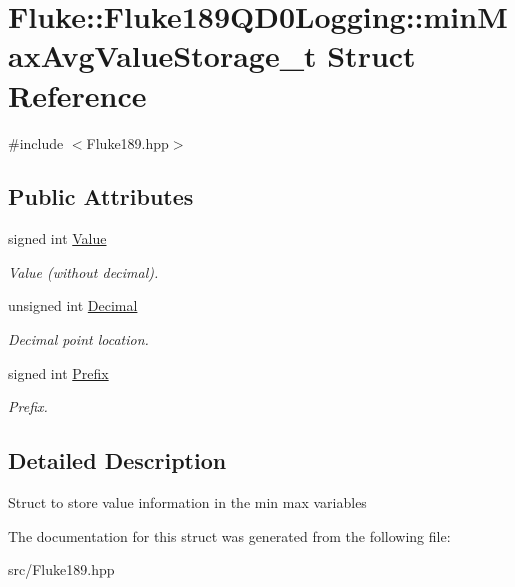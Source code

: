 \hypertarget{structFluke_1_1Fluke189QD0Logging_1_1minMaxAvgValueStorage__t}{
\section{Fluke::Fluke189QD0Logging::minMaxAvgValueStorage\_\-t Struct Reference}
\label{structFluke_1_1Fluke189QD0Logging_1_1minMaxAvgValueStorage__t}
}


{\ttfamily \#include $<$Fluke189.hpp$>$}\subsection*{Public Attributes}
\begin{DoxyCompactItemize}
\item 
\hypertarget{structFluke_1_1Fluke189QD0Logging_1_1minMaxAvgValueStorage__t_a77c06b226427799a17e72490de249ee5}{
signed int \hyperlink{structFluke_1_1Fluke189QD0Logging_1_1minMaxAvgValueStorage__t_a77c06b226427799a17e72490de249ee5}{Value}}
\label{structFluke_1_1Fluke189QD0Logging_1_1minMaxAvgValueStorage__t_a77c06b226427799a17e72490de249ee5}

\begin{DoxyCompactList}\small\item\em Value (without decimal). \item\end{DoxyCompactList}\item 
\hypertarget{structFluke_1_1Fluke189QD0Logging_1_1minMaxAvgValueStorage__t_a4cd128da7639e431620a55a1e6277c32}{
unsigned int \hyperlink{structFluke_1_1Fluke189QD0Logging_1_1minMaxAvgValueStorage__t_a4cd128da7639e431620a55a1e6277c32}{Decimal}}
\label{structFluke_1_1Fluke189QD0Logging_1_1minMaxAvgValueStorage__t_a4cd128da7639e431620a55a1e6277c32}

\begin{DoxyCompactList}\small\item\em Decimal point location. \item\end{DoxyCompactList}\item 
\hypertarget{structFluke_1_1Fluke189QD0Logging_1_1minMaxAvgValueStorage__t_acb3acbb4970ef944283b3ab0fcb10004}{
signed int \hyperlink{structFluke_1_1Fluke189QD0Logging_1_1minMaxAvgValueStorage__t_acb3acbb4970ef944283b3ab0fcb10004}{Prefix}}
\label{structFluke_1_1Fluke189QD0Logging_1_1minMaxAvgValueStorage__t_acb3acbb4970ef944283b3ab0fcb10004}

\begin{DoxyCompactList}\small\item\em Prefix. \item\end{DoxyCompactList}\end{DoxyCompactItemize}


\subsection{Detailed Description}
Struct to store value information in the min max variables 

The documentation for this struct was generated from the following file:\begin{DoxyCompactItemize}
\item 
src/Fluke189.hpp\end{DoxyCompactItemize}
